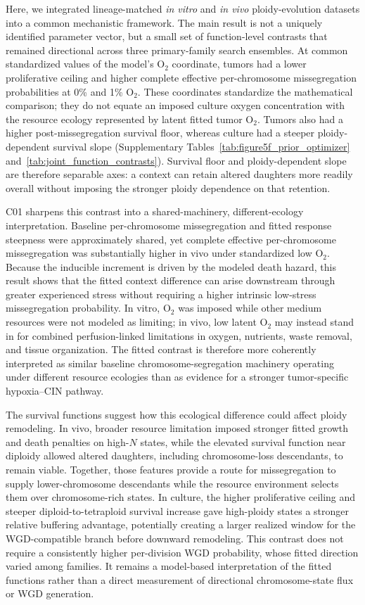 \documentclass[11pt]{article}
\begin{document}
Here, we integrated lineage-matched \textit{in vitro} and \textit{in vivo} ploidy-evolution datasets into a common mechanistic framework. The main result is not a uniquely identified parameter vector, but a small set of function-level contrasts that remained directional across three primary-family search ensembles. At common standardized values of the model's O$_2$ coordinate, tumors had a lower proliferative ceiling and higher complete effective per-chromosome missegregation probabilities at 0\% and 1\% O$_2$. These coordinates standardize the mathematical comparison; they do not equate an imposed culture oxygen concentration with the resource ecology represented by latent fitted tumor O$_2$. Tumors also had a higher post-missegregation survival floor, whereas culture had a steeper ploidy-dependent survival slope (Supplementary Tables~\ref{tab:figure5f_prior_optimizer} and~\ref{tab:joint_function_contrasts}). Survival floor and ploidy-dependent slope are therefore separable axes: a context can retain altered daughters more readily overall without imposing the stronger ploidy dependence on that retention.

C01 sharpens this contrast into a shared-machinery, different-ecology interpretation. Baseline per-chromosome missegregation and fitted response steepness were approximately shared, yet complete effective per-chromosome missegregation was substantially higher in vivo under standardized low O$_2$. Because the inducible increment is driven by the modeled death hazard, this result shows that the fitted context difference can arise downstream through greater experienced stress without requiring a higher intrinsic low-stress missegregation probability. In vitro, O$_2$ was imposed while other medium resources were not modeled as limiting; in vivo, low latent O$_2$ may instead stand in for combined perfusion-linked limitations in oxygen, nutrients, waste removal, and tissue organization. The fitted contrast is therefore more coherently interpreted as similar baseline chromosome-segregation machinery operating under different resource ecologies than as evidence for a stronger tumor-specific hypoxia--CIN pathway.

The survival functions suggest how this ecological difference could affect ploidy remodeling. In vivo, broader resource limitation imposed stronger fitted growth and death penalties on high-\(N\) states, while the elevated survival function near diploidy allowed altered daughters, including chromosome-loss descendants, to remain viable. Together, those features provide a route for missegregation to supply lower-chromosome descendants while the resource environment selects them over chromosome-rich states. In culture, the higher proliferative ceiling and steeper diploid-to-tetraploid survival increase gave high-ploidy states a stronger relative buffering advantage, potentially creating a larger realized window for the WGD-compatible branch before downward remodeling. This contrast does not require a consistently higher per-division WGD probability, whose fitted direction varied among families. It remains a model-based interpretation of the fitted functions rather than a direct measurement of directional chromosome-state flux or WGD generation.
\end{document}
